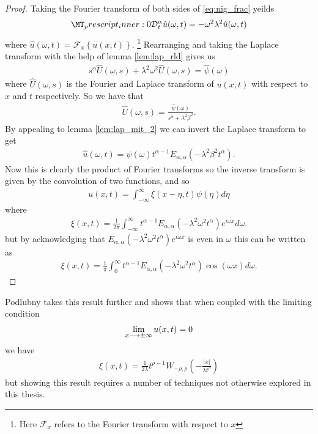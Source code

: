 \begin{proof}
    Taking the Fourier transform of both sides of \eqref{eq:nig_frac} yeilds
    \begin{align}
        \prescript{}{0}{\mathcal{D}}^\alpha_t \hat{u}(\omega,t) = -\omega^2\lambda^2 \hat{u}(\omega, t)
    \end{align}
    where $ \hat{u}(\omega, t) = \mathcal{F}_x\left\{ u(x,t) \right\} $. \footnote{Here $ \mathcal{F}_x $ refers to the Fourier transform with respect to $ x $}
    Rearranging and taking the Laplace transform with the help of lemma \ref{lem:lap_rld} gives us
    \begin{align}
        s^\alpha\hat{U}(\omega, s) + \lambda^2\omega^2 \hat{U}(\omega,s) = \hat{\psi}(\omega)
    \end{align}
    where $ \hat{U}(\omega, s) $ is the Fourier and Laplace transform of $ u(x,t) $ with respect to $ x $ and $ t $ respectively.
    So we have that
    \begin{align}
        \hat{U}(\omega, s) = \frac{\hat{\psi}(\omega)}{s^\alpha + \lambda^2\beta^2}.
    \end{align}
    By appealing to lemma \ref{lem:lap_mit_2} we can invert the Laplace transform to get
    \begin{align}
        \hat{u}(\omega, t) = \psi(\omega)t^{\alpha-1} E_{\alpha, \alpha}(-\lambda^2\beta^2t^\alpha).
    \end{align}
    Now this is clearly the product of Fourier transforms so the inverse transform is given by the convolution of two functions, and so
    \begin{align}
        u(x,t) = \int_{-\infty}^\infty \xi(x - \eta, t) \psi(\eta) d\eta
    \end{align}
    where
    \begin{align}
        \xi(x,t) = \frac{1}{2\pi} \int_{-\infty}^\infty t^{\alpha - 1} E_{\alpha, \alpha}(-\lambda^2\omega^2t^\alpha)e^{i\omega x}d\omega.
    \end{align}
    but by acknowledging that $ E_{\alpha, \alpha}(-\lambda^2\omega^2t^\alpha)e^{i\omega x} $ is even in $ \omega $ this can be written as 
    \begin{align}
        \xi(x,t) = \frac{1}{\pi} \int_0^\infty t^{\alpha - 1} E_{\alpha, \alpha}(-\lambda^2\omega^2t^\alpha)\cos(\omega x)d\omega.
    \end{align}
\end{proof}
    Podlubny \cite{Podlubny1999} takes this result further and shows that when coupled with the limiting condition
    \begin{align}
        \lim_{x \longrightarrow \pm \infty} u(x,t) = 0
    \end{align}
    we have
    \begin{align}
        \xi(x,t) = \frac{1}{2\lambda} t^{\rho-1}W_{-\rho,\rho}\left(-\frac{|x|}{\lambda t^\rho}\right)
    \end{align}
    but showing this result requires a number of techniques not otherwise explored in this thesis.
    
